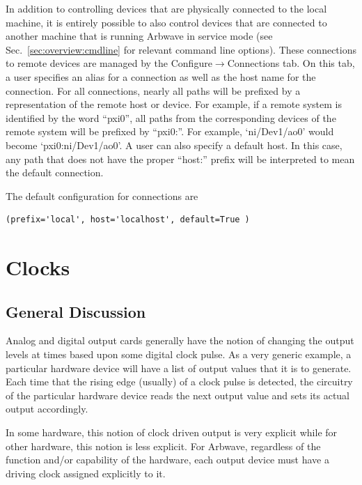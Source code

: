 In addition to controlling devices that are physically connected to the local
machine, it is entirely possible to also control devices that are connected to
another machine that is running Arbwave in service mode (see
Sec.~\ref{sec:overview:cmdline} for relevant command line options).
These connections to remote devices are managed by the
Configure$\rightarrow$Connections tab.  On this tab, a user specifies an alias for a
connection as well as the host name for the connection.
For all connections, nearly all paths will be prefixed by a
representation of the remote host or device.  For example, if a remote system is
identified by the word ``pxi0'', all paths from the corresponding devices of the
remote system will be prefixed by ``pxi0:''.  For example, `ni/Dev1/ao0' would become
`pxi0:ni/Dev1/ao0'.  A user can also specify a default host.  In this case, any
path that does not have the proper ``host:'' prefix will be interpreted to mean
the default connection.

The default configuration for connections are
\begin{lstlisting}
(prefix='local', host='localhost', default=True )
\end{lstlisting}


\section{Clocks}\label{sec:devcfg:clocks}

\subsection{General Discussion}
Analog and digital output cards generally have the notion of changing the output
levels at times based upon some digital clock pulse.  As a very generic example,
a particular hardware device will have a list of output values that it is to
generate.  Each time that the rising edge (usually) of a clock pulse is
detected, the circuitry of the particular hardware device reads the next output
value and sets its actual output accordingly.

In some hardware, this notion of clock driven output is very explicit while for
other hardware, this notion is less explicit.  For Arbwave, regardless of the
function and/or capability of the hardware, each output device must have a
driving clock assigned explicitly to it.

